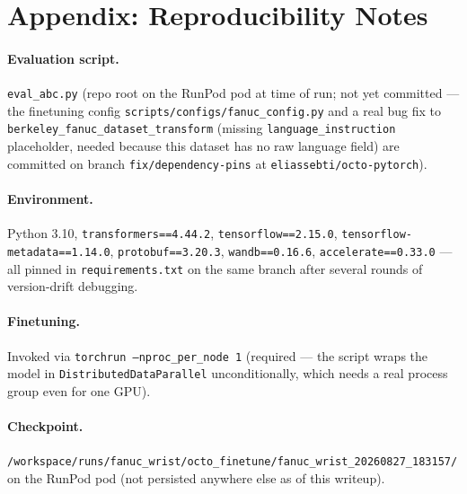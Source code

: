 \documentclass[11pt]{article}
\begin{document}
\section*{Appendix: Reproducibility Notes}

\paragraph{Evaluation script.} \texttt{eval\_abc.py} (repo root on the RunPod pod at time of run; not yet committed --- the finetuning config \texttt{scripts/configs/fanuc\_config.py} and a real bug fix to \texttt{berkeley\_fanuc\_dataset\_transform} (missing \texttt{language\_instruction} placeholder, needed because this dataset has no raw language field) are committed on branch \texttt{fix/dependency-pins} at \texttt{eliassebti/octo-pytorch}).

\paragraph{Environment.} Python 3.10, \texttt{transformers==4.44.2}, \texttt{tensorflow==2.15.0}, \texttt{tensorflow-metadata==1.14.0}, \texttt{protobuf==3.20.3}, \texttt{wandb==0.16.6}, \texttt{accelerate==0.33.0} --- all pinned in \texttt{requirements.txt} on the same branch after several rounds of version-drift debugging.

\paragraph{Finetuning.} Invoked via \texttt{torchrun --nproc\_per\_node 1} (required --- the script wraps the model in \texttt{DistributedDataParallel} unconditionally, which needs a real process group even for one GPU).

\paragraph{Checkpoint.} \texttt{/workspace/runs/fanuc\_wrist/octo\_finetune/fanuc\_wrist\_20260827\_183157/} on the RunPod pod (not persisted anywhere else as of this writeup).
\end{document}
